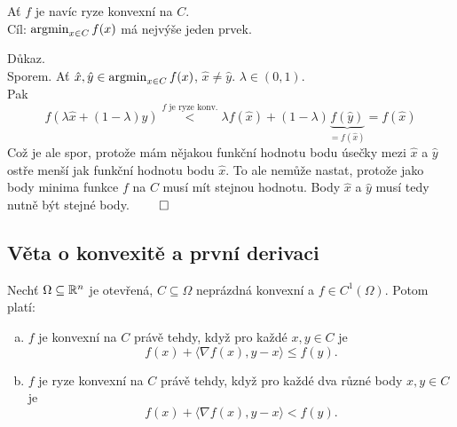 Ať $f$ je navíc ryze konvexní na $C$.\\
Cíl: $\operatorname*{argmin}_{x \in C} f(x)$ má nejvýše jeden prvek.

Důkaz.\\
Sporem. Ať $\hat x, \hat y \in \operatorname*{argmin}_{x \in C} f(x)$, $\hat x \not=\hat y$. $\lambda \in (0,1)$.\\
Pak
\[
    f(\lambda \hat x  + (1-\lambda) \hat y) \overset{f \text{ je ryze konv.}}{<} \lambda f(\hat x) + (1-\lambda)
    \underbrace{f(\hat y)}_{= f(\hat x)} = f(\hat x)
\]
Což je ale spor, protože mám nějakou funkční hodnotu bodu úsečky mezi $\hat x$ a $\hat y$ ostře menší jak funkční
hodnotu bodu $\hat x$. To ale nemůže nastat, protože jako body minima funkce $f$ na $C$ musí mít stejnou hodnotu. Body
$\hat x$ a $\hat y$ musí tedy nutně být stejné body. $\qed$

\subsection{Věta o konvexitě a první derivaci}\label{konvDeriv}
Nechť $\Omega \subseteq \mathbb{R}^n$ je otevřená, $C \subseteq \Omega$ neprázdná konvexní a $f \in C^{1} (\Omega)$. Potom
platí:
\begin{enumerate}[(a)]
    \item $f$ je konvexní na $C$ právě tehdy, když pro každé $x, y \in C$ je
    \[
        f(x) + \langle \nabla f(x), y-x\rangle \leq f(y).
    \]
    \item $f$ je ryze konvexní na $C$ právě tehdy, když pro každé dva různé body $x, y \in C$ je
    \[
        f(x) + \langle \nabla f(x), y-x\rangle < f(y).
    \]
\end{enumerate}
\begin{figure}[H]
    \centering
\end{figure}


